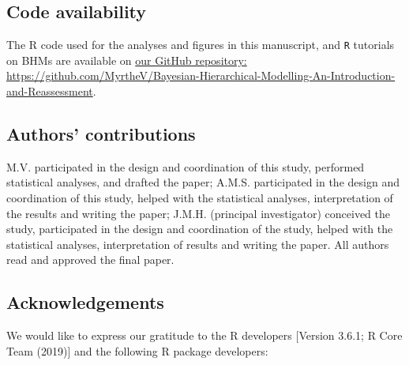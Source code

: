\documentclass[
  english,
  doc,floatsintext]{apa6}
\begin{document}
\hypertarget{code-availability}{%
\subsection{Code availability}\label{code-availability}}

The R code used for the analyses and figures in this manuscript, and \texttt{R} tutorials on BHMs are available on \href{https://github.com/MyrtheV/Bayesian-Hierarchical-Modelling-An-Introduction-and-Reassessment}{our GitHub repository: https://github.com/MyrtheV/Bayesian-Hierarchical-Modelling-An-Introduction-and-Reassessment}.

\hypertarget{authors-contributions}{%
\subsection{Authors' contributions}\label{authors-contributions}}

M.V. participated in the design and coordination of this study, performed statistical analyses, and drafted the paper; A.M.S. participated in the design and coordination of this study, helped with the statistical analyses, interpretation of the results and writing the paper; J.M.H. (principal investigator) conceived the study, participated in the design and coordination of the study, helped with the statistical analyses, interpretation of results and writing the paper. All authors read and approved the final paper.

\hypertarget{acknowledgements}{%
\subsection{Acknowledgements}\label{acknowledgements}}

We would like to express our gratitude to the R developers {[}Version 3.6.1; R Core Team (2019){]} and the following R package developers:
\end{document}
